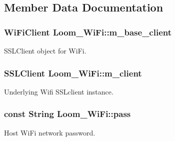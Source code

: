 \subsection{Member Data Documentation}
\subsubsection[{\texorpdfstring{m\+\_\+base\+\_\+client}{m_base_client}}]{\setlength{\rightskip}{0pt plus 5cm}Wi\+Fi\+Client Loom\+\_\+\+Wi\+Fi\+::m\+\_\+base\+\_\+client\hspace{0.3cm}{\ttfamily [protected]}}\hypertarget{class_loom___wi_fi_ac3c4d4aaaea4f70ac9b613a5248a7070}{}\label{class_loom___wi_fi_ac3c4d4aaaea4f70ac9b613a5248a7070}


S\+S\+L\+Client object for Wi\+Fi. 

\subsubsection[{\texorpdfstring{m\+\_\+client}{m_client}}]{\setlength{\rightskip}{0pt plus 5cm}S\+S\+L\+Client Loom\+\_\+\+Wi\+Fi\+::m\+\_\+client\hspace{0.3cm}{\ttfamily [protected]}}\hypertarget{class_loom___wi_fi_aece9cee623f146f89ee4d282aa012c79}{}\label{class_loom___wi_fi_aece9cee623f146f89ee4d282aa012c79}


Underlying Wifi S\+S\+Lclient instance. 

\subsubsection[{\texorpdfstring{pass}{pass}}]{\setlength{\rightskip}{0pt plus 5cm}const String Loom\+\_\+\+Wi\+Fi\+::pass\hspace{0.3cm}{\ttfamily [protected]}}\hypertarget{class_loom___wi_fi_a36402713f3a011add130d1b0b8182822}{}\label{class_loom___wi_fi_a36402713f3a011add130d1b0b8182822}


Host Wi\+Fi network password. 

